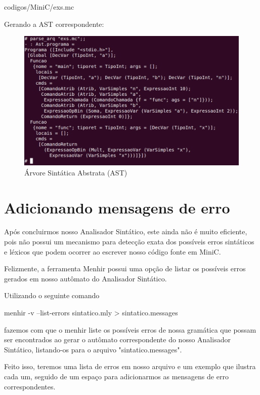\documentclass[12pt,a4paper,twoside]{report}
\begin{document}
 {codigos/MiniC/exs.mc}\

Gerando a AST correspondente:

\begin{figure}[!h]
\centering
\caption{Árvore Sintática Abstrata (AST)} \label{fig:sintatico}
\includegraphics[scale=0.45]{imagens/exs.png}
\end{figure}

\section{Adicionando mensagens de erro}

Após concluirmos nosso Analisador Sintático, este ainda não é muito eficiente, pois não possui um mecanismo para detecção exata dos possíveis erros sintáticos e léxicos que podem ocorrer ao escrever nosso código fonte em MiniC.

Felizmente, a ferramenta Menhir possui uma opção de listar os possíveis erros gerados em nosso autômato do Analisador Sintático.

Utilizando o seguinte comando

\begin{terminal}
menhir -v --list-errors sintatico.mly > sintatico.messages
\end{terminal}

fazemos com que o menhir liste os possíveis erros de nossa gramática que possam ser encontrados ao gerar o autômato correspondente do nosso Analisador Sintático, listando-os para o arquivo "sintatico.messages".

Feito isso, teremos uma lista de erros em nosso arquivo e um exemplo que ilustra cada um, seguido de um espaço para adicionarmos as mensagens de erro correspondentes.
\end{document}

